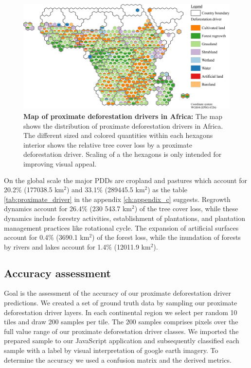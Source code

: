 			\begin{figure}[ht]
				\centering
				\includegraphics[scale=1]{img/africa_driver_frameless}
				\caption[Map of proximate deforestion drivers in Africa]{\textbf{Map of proximate deforestation drivers in Africa:} The map shows the distribution of proximate deforestation drivers in Africa. The different sized and colored quantities within each hexagons interior shows the relative tree cover loss by a proximate deforestation driver. Scaling of a the hexagons is only intended for improving visual appeal.}
				\label{fig:africa_driver}
			\end{figure}

			On the global scale the major \acp{PDD} are cropland and pastures which account for 20.2\% (177038.5 km$^2$) and 33.1\% (289445.5 km$^2$) as the table \ref{tab:proximate_driver} in the appendix \ref{ch:appendix_c} suggests. Regrowth dynamics account for 26.4\% (230 543.7 km$^2$) of the tree cover loss, while these dynamics include forestry activities, establishment of plantations, and plantation management practices like rotational cycle. The expansion of artificial surfaces account for 0.4\% (3690.1 km$^2$) of the forest loss, while the inundation of forests by rivers and lakes account for 1.4\% (12011.9 km$^2$). \citep{Houghton2012a}

		\subsection{Accuracy assessment}
		\label{subsec:results_accuracy_assessment}
			 Goal is the assessment of the accuracy of our proximate deforestation driver predictions. We created a set of ground truth data by sampling our proximate deforestation driver layers. In each continental region we select per random 10 tiles and draw 200 samples per tile. The 200 samples comprises pixels over the full value range of our proximate deforestation driver classes. We imported the prepared sample to our JavaScript application and subsequently classified each sample with a label by visual interpretation of google earth imagery. To determine the accuracy we used a confusion matrix and the derived metrics.

